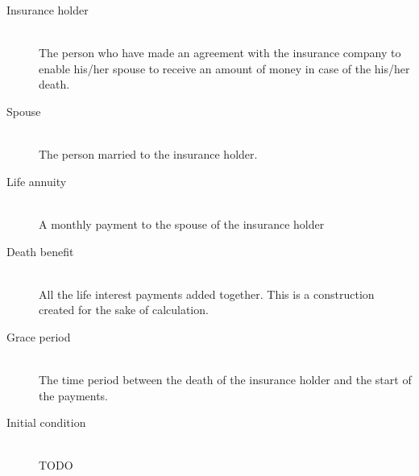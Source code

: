 \begin{description}
	\item[Insurance holder] \hfill \\
	The person who have made an agreement with the insurance company to enable his/her spouse to receive an amount of money in case of the his/her death.
	\item[Spouse] \hfill \\
	The person married to the insurance holder.
	\item[Life annuity] \hfill \\
	A monthly payment to the spouse of the insurance holder
	\item[Death benefit] \hfill \\
	All the life interest payments added together. This is a construction created for the sake of calculation. 
	\item[Grace period] \hfill \\
	The time period between the death of the insurance holder and the start of the payments. 
	\item[Initial condition] \hfill \\
	TODO
\end{description}
